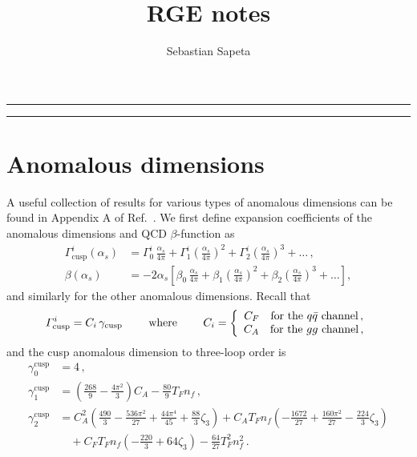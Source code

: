 \documentclass[a4paper,11pt]{article}
\title{RGE notes}
\author{Sebastian Sapeta}
\numberwithin{equation}{section}
\begin{document}
\maketitle


\noindent \rule{\textwidth}{1pt}
\tableofcontents
\noindent \rule{\textwidth}{1pt}


\section{Anomalous dimensions}

A useful collection of results for various types of anomalous dimensions can be
found in Appendix A of Ref.~\cite{Ahrens:2010zv}.
%
We first define expansion coefficients of the anomalous dimensions and QCD
$\beta$-function as
\begin{align}
  \label{eq:gammaexp}
  \Gamma_{\text{cusp}}^i(\alpha_s) &= 
  \Gamma_0^i \, \frac{\alpha_s}{4\pi} + 
  \Gamma_1^i \left( \frac{\alpha_s}{4\pi} \right)^2 + 
  \Gamma_2^i \left( \frac{\alpha_s}{4\pi} \right)^3 +
  \ldots \, , \nonumber
  \\
  \beta(\alpha_s) &= -2\alpha_s \left[ \beta_0 \, \frac{\alpha_s}{4\pi} + \beta_1 \left(
      \frac{\alpha_s}{4\pi} \right)^2 + \beta_2 \left( \frac{\alpha_s}{4\pi} \right)^3 +
    \ldots \right] ,
\end{align}
and similarly for the other anomalous dimensions.
%
Recall that 
%
\begin{equation}
  \Gamma_{\rm cusp}^i  =  C_i\, \gamma_{\rm cusp}
  \qquad
  \text{ where }
  \qquad
  C_i =  \left\{
  \begin{array}{cc}
    C_F \quad \text{for the $q\bar q$ channel}\,, \\
    C_A \quad \text{for the $gg$ channel}\,,
  \end{array}
  \right.
\end{equation}
% 
and the cusp anomalous dimension to three-loop order is
\cite{Moch:2004pa}
%
\begin{align}
  \gamma^{\text{cusp}}_0 &= 4 \, ,
  \nonumber
  \\
  \gamma^{\text{cusp}}_1 &= \left( \frac{268}{9} - \frac{4\pi^2}{3} \right) C_A -
  \frac{80}{9} T_F n_f \, ,
  \nonumber
  \\
  \gamma^{\text{cusp}}_2 &= C_A^2 \left( \frac{490}{3} - \frac{536\pi^2}{27} +
    \frac{44\pi^4}{45} + \frac{88}{3} \zeta_3 \right) + C_A T_F n_f \left( -
    \frac{1672}{27} + \frac{160\pi^2}{27} - \frac{224}{3} \zeta_3 \right) \nonumber
  \\
  &\quad + C_F T_F n_f \left( - \frac{220}{3} + 64 \zeta_3 \right) - \frac{64}{27} T_F^2
  n_f^2 \, .
\end{align}
\end{document}
